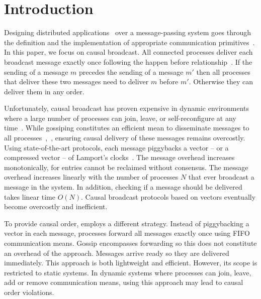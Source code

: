 
\section{Introduction}

Designing distributed
applications~\cite{demers1987epidemic,nakamoto2009bitcoin,nedelec2016crate,shapiro2011comprehensive}
over a message-passing system goes through the definition and the implementation
of appropriate communication primitives~\cite{hadzilacos1994modular}.  In this
paper, we focus on causal broadcast.
All connected processes deliver each broadcast message exactly once following
the happen before relationship~\cite{lamport1978time,schwarz1994detecting}. If
the sending of a message $m$ precedes the sending of a message $m'$ then all
processes that deliver these two messages need to deliver $m$ before
$m'$. Otherwise they can deliver them in any order.

Unfortunately, causal broadcast has proven expensive in dynamic environments
where a large number of processes can join, leave, or self-reconfigure at any
time~\cite{charronbost1991concerning}. While gossiping constitutes an efficient
mean to disseminate messages to all
processes~\cite{demers1987epidemic},~\cite{birman1999bimodal}, ensuring causal
delivery of these messages remains overcostly.  Using state-of-the-art
protocols, each message piggybacks a vector -- or a compressed vector -- of
Lamport's
clocks~\cite{almeida2008interval,fidge1988timestamps,mattern1989virtual,singhal1992efficient}.
The message overhead increases monotonically, for entries cannot be reclaimed
without consensus. The message overhead increases linearly with the number of
processes $N$ that ever broadcast a message in the system.  In addition,
checking if a message should be delivered takes linear time $O(N)$. Causal
broadcast protocols based on vectors eventually become overcostly and
inefficient.


To provide causal order, \cite{friedman2004causal} employs a different
strategy. Instead of piggybacking a vector in each message, processes forward
all messages exactly once using FIFO communication means. Gossip encompasses
forwarding so this does not constitute an overhead of the approach.  Messages
arrive ready so they are delivered immediately. This approach is both
lightweight and efficient. However, its scope is restricted to static systems.
In dynamic systems where processes can join, leave, add or remove communication
means, using this approach may lead to causal order violations.


